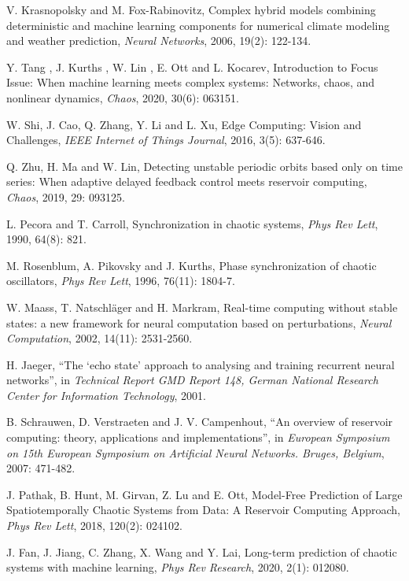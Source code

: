 \documentclass[notitlepage,cs4size,punct,oneside]{ctexrep}
\numberwithin{equation}{chapter}
\theoremstyle{mystyle}
\begin{document}
\begin{thebibliography}{99}
\footnotesize

 V. Krasnopolsky and M. Fox-Rabinovitz, 
Complex hybrid models combining deterministic and machine learning components for numerical climate modeling and weather prediction,
\emph{Neural Networks}, 2006, 19(2): 122-134.

 Y. Tang , J. Kurths , W. Lin , E. Ott and L. Kocarev,
Introduction to Focus Issue: When machine learning meets complex systems: Networks, chaos, and nonlinear dynamics,
\emph{Chaos}, 2020, 30(6): 063151.

 W. Shi, J. Cao, Q. Zhang, Y. Li and L. Xu,
Edge Computing: Vision and Challenges,
\emph{IEEE Internet of Things Journal}, 2016, 3(5): 637-646.

 Q. Zhu, H. Ma and W. Lin,
Detecting unstable periodic orbits based only on time series: When adaptive delayed feedback control meets reservoir computing,
\emph{Chaos}, 2019, 29: 093125.

 L. Pecora and T. Carroll,
Synchronization in chaotic systems, 
\emph{Phys Rev Lett}, 1990, 64(8): 821. 

 M. Rosenblum, A. Pikovsky and J. Kurths,
Phase synchronization of chaotic oscillators, 
\emph{Phys Rev Lett}, 1996, 76(11): 1804-7. 

 W. Maass, T. Natschläger and H. Markram,
Real-time computing without stable states: a new framework for neural computation based on perturbations, 
\emph{Neural Computation}, 2002, 14(11): 2531-2560. 

 H. Jaeger, 
``The `echo state' approach to analysing and training recurrent neural networks'', in
\emph{Technical Report GMD Report 148, German National Research Center for Information Technology}, 
2001.

 B. Schrauwen, D. Verstraeten and J. V. Campenhout, 
``An overview of reservoir computing: theory, applications and implementations'', in
\emph{European Symposium on 15th European Symposium on Artificial Neural Networks. Bruges, Belgium}, 
2007: 471-482.

 J. Pathak, B. Hunt, M. Girvan, Z. Lu and E. Ott,
Model-Free Prediction of Large Spatiotemporally Chaotic Systems from Data: A Reservoir Computing Approach, 
\emph{Phys Rev Lett}, 2018, 120(2): 024102.

 J. Fan, J. Jiang, C. Zhang, X. Wang and Y. Lai,
Long-term prediction of chaotic systems with machine learning, 
\emph{Phys Rev Research}, 2020, 2(1): 012080.



\end{thebibliography}
\end{document}
